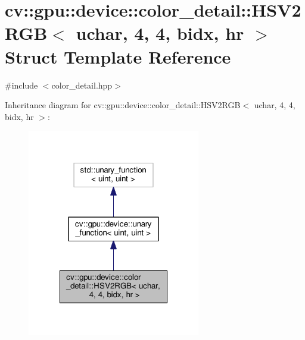 \hypertarget{structcv_1_1gpu_1_1device_1_1color__detail_1_1HSV2RGB_3_01uchar_00_014_00_014_00_01bidx_00_01hr_01_4}{\section{cv\-:\-:gpu\-:\-:device\-:\-:color\-\_\-detail\-:\-:H\-S\-V2\-R\-G\-B$<$ uchar, 4, 4, bidx, hr $>$ Struct Template Reference}
\label{structcv_1_1gpu_1_1device_1_1color__detail_1_1HSV2RGB_3_01uchar_00_014_00_014_00_01bidx_00_01hr_01_4}
}


{\ttfamily \#include $<$color\-\_\-detail.\-hpp$>$}



Inheritance diagram for cv\-:\-:gpu\-:\-:device\-:\-:color\-\_\-detail\-:\-:H\-S\-V2\-R\-G\-B$<$ uchar, 4, 4, bidx, hr $>$\-:\nopagebreak
\begin{figure}[H]
\begin{center}
\leavevmode
\includegraphics[width=214pt]{structcv_1_1gpu_1_1device_1_1color__detail_1_1HSV2RGB_3_01uchar_00_014_00_014_00_01bidx_00_01hr_01_4__inherit__graph}
\end{center}
\end{figure}


